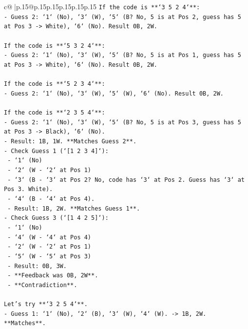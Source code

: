 \documentclass{article}
\begin{document}
{\begin{supertabular}{c@{$\;$}|p{.15\linewidth}@{}p{.15\linewidth}p{.15\linewidth}p{.15\linewidth}p{.15\linewidth}p{.15\linewidth}}
{{{\texttt{If the code is **`3 5 2 4`**:} \\
\texttt{{-}   Guess 2: `1` (No), `3` (W), `5` (B? No, 5 is at Pos 2, guess has 5 at Pos 3 {-}> White), `6` (No). Result 0B, 2W.} \\
\\ 
\texttt{If the code is **`5 3 2 4`**:} \\
\texttt{{-}   Guess 2: `1` (No), `3` (W), `5` (B? No, 5 is at Pos 1, guess has 5 at Pos 3 {-}> White), `6` (No). Result 0B, 2W.} \\
\\ 
\texttt{If the code is **`5 2 3 4`**:} \\
\texttt{{-}   Guess 2: `1` (No), `3` (W), `5` (W), `6` (No). Result 0B, 2W.} \\
\\ 
\texttt{If the code is **`2 3 5 4`**:} \\
\texttt{{-}   Guess 2: `1` (No), `3` (W), `5` (B? No, 5 is at Pos 3, guess has 5 at Pos 3 {-}> Black), `6` (No).} \\
\texttt{{-}   Result: 1B, 1W. **Matches Guess 2**.} \\
\texttt{{-}   Check Guess 1 (`{[}1 2 3 4{]}`):} \\
\texttt{    {-}   `1` (No)} \\
\texttt{    {-}   `2` (W {-} `2` at Pos 1)} \\
\texttt{    {-}   `3` (B {-} `3` at Pos 2? No, code has `3` at Pos 2. Guess has `3` at Pos 3. White).} \\
\texttt{    {-}   `4` (B {-} `4` at Pos 4).} \\
\texttt{    {-}   Result: 1B, 2W. **Matches Guess 1**.} \\
\texttt{{-}   Check Guess 3 (`{[}1 4 2 5{]}`):} \\
\texttt{    {-}   `1` (No)} \\
\texttt{    {-}   `4` (W {-} `4` at Pos 4)} \\
\texttt{    {-}   `2` (W {-} `2` at Pos 1)} \\
\texttt{    {-}   `5` (W {-} `5` at Pos 3)} \\
\texttt{    {-}   Result: 0B, 3W.} \\
\texttt{    {-}   **Feedback was 0B, 2W**.} \\
\texttt{    {-}   **Contradiction**.} \\
\\ 
\texttt{Let's try **`3 2 5 4`**.} \\
\texttt{{-}   Guess 1: `1` (No), `2` (B), `3` (W), `4` (W). {-}> 1B, 2W. **Matches**.} \\
}}}
\end{supertabular}}
\end{document}
